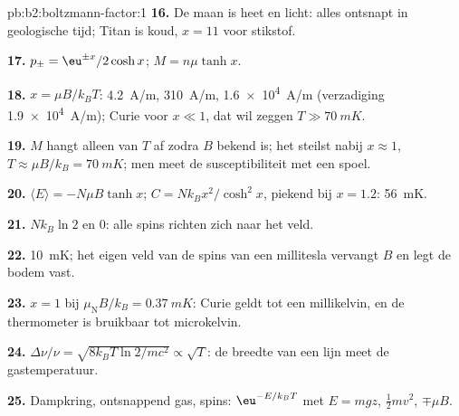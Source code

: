 \begin{solution}{pb:b2:boltzmann-factor:1}
\textbf{16.} De maan is heet en licht: alles ontsnapt in
geologische tijd; Titan is koud, $x = 11$ voor stikstof.

\textbf{17.} $p_\pm = \eu^{\pm x}/2\cosh x$; $M = n\mu\tanh x$.

\textbf{18.} $x = \mu B/k_BT$: \qty{4.2}{A/m}, \qty{310}{A/m}, \qty{1.6e4}{A/m}
(verzadiging \qty{1.9e4}{A/m}); Curie voor $x \ll 1$, dat wil zeggen
$T \gg \qty{70}{mK}$.

\textbf{19.} $M$ hangt alleen van $T$ af zodra $B$ bekend is; het steilst nabij
$x \approx 1$, $T \approx \mu B/k_B = \qty{70}{mK}$; men meet de
susceptibiliteit met een spoel.

\textbf{20.} $\langle E\rangle = -N\mu B\tanh x$; $C = Nk_Bx^2/\cosh^2x$,
piekend bij
$x = 1.2$: \qty{56}{mK}.

\textbf{21.} $Nk_B\ln 2$ en $0$: alle spins richten zich naar het veld.

\textbf{22.} \qty{10}{mK}; het eigen veld van de spins van een millitesla
vervangt $B$
en legt de bodem vast.

\textbf{23.} $x = 1$ bij $\mu_{\text{N}}B/k_B = \qty{0.37}{mK}$: Curie geldt tot een
millikelvin, en de thermometer is bruikbaar tot microkelvin.

\textbf{24.} $\Delta\nu/\nu = \sqrt{8k_BT\ln2/mc^2} \propto \sqrt T$: de breedte
van een lijn meet de gastemperatuur.

\textbf{25.} Dampkring, ontsnappend gas, spins: $\eu^{-E/k_BT}$ met $E = mgz$,
$\tfrac12mv^2$, $\mp\mu B$.
\end{solution}
